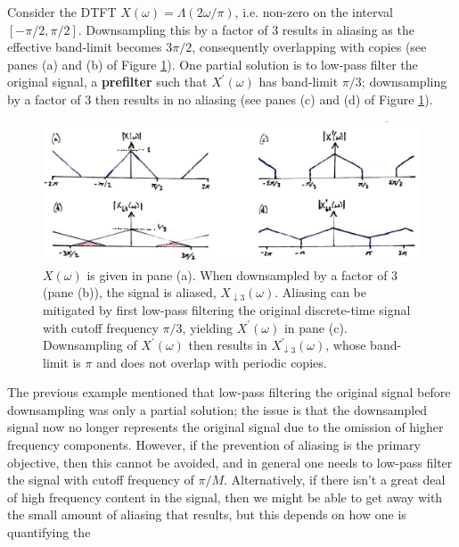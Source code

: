 \begin{exmp}
  Consider the DTFT $X(\omega) = \Lambda(2\omega/\pi)$, i.e. non-zero on the interval
  $[-\pi/2,\pi/2]$. Downsampling this by a factor of 3 results in aliasing as the
  effective band-limit becomes $3\pi/2$, consequently overlapping with copies
  (see panes (a) and (b) of Figure \ref{fig::lecture_14_triangle_example}).
  One partial solution is to low-pass filter
  the original signal, a \textbf{prefilter} such that $X^\prime(\omega)$ has band-limit
  $\pi/3$; downsampling by a factor of 3 then results in no aliasing (see panes (c) and
  (d) of Figure \ref{fig::lecture_14_triangle_example}).
  \begin{figure}[H]
    \includegraphics[width=\textwidth]{images/lecture_14_triangle_example.JPG}
    \caption{$X(\omega)$ is given in pane (a). When downsampled by a factor of
      3 (pane (b)), the signal is aliased, $X_{\downarrow 3}(\omega)$. Aliasing
      can be mitigated by first low-pass filtering the original discrete-time
      signal with cutoff frequency $\pi/3$, yielding $X^\prime(\omega)$ in
      pane (c). Downsampling of $X^\prime(\omega)$ then results in
      $X^\prime_{\downarrow 3}(\omega)$, whose band-limit is $\pi$ and does
      not overlap with periodic copies.
    }
    \label{fig::lecture_14_triangle_example}
  \end{figure}
\end{exmp}
%
The previous example mentioned that low-pass filtering the original signal before
downsampling was only a partial solution; the issue is that the downsampled signal
now no longer represents the original signal due to the omission of higher frequency
components. However, if the prevention of aliasing is the primary objective, then this
cannot be avoided, and in general one needs to low-pass filter the signal with
cutoff frequency of $\pi/M$. Alternatively, if there isn't a great deal of high
frequency content in the signal, then we might be able to get away with the small
amount of aliasing that results, but this depends on how one is quantifying the
